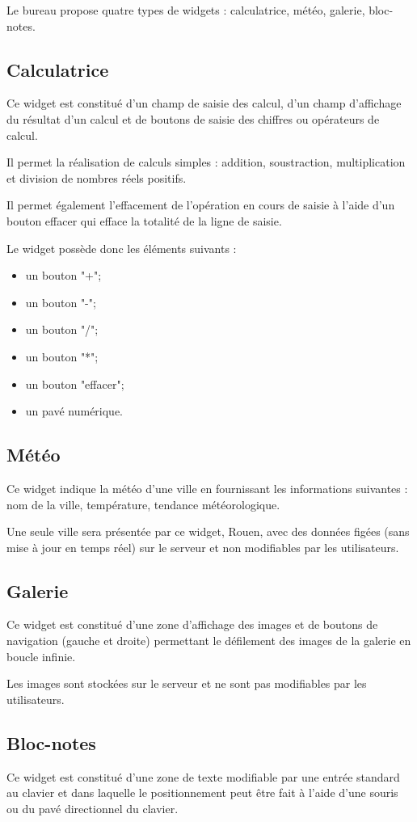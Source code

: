 Le bureau propose quatre types de widgets : calculatrice, météo, galerie, bloc-notes.

\subsection*{Calculatrice}
Ce widget est constitué d'un champ de saisie des calcul, d'un champ d'affichage du résultat d'un calcul et de boutons de saisie des chiffres ou opérateurs de calcul.

Il permet la réalisation de calculs simples : addition, soustraction, multiplication et division de nombres réels positifs.

Il permet également l'effacement de l'opération en cours de saisie à l'aide d'un bouton effacer qui efface la totalité de la ligne de saisie.

Le widget possède donc les éléments suivants :
\begin{itemize}
\item un bouton "+";
\item un bouton "-";
\item un bouton "/";
\item un bouton "*";
\item un bouton "effacer";
\item un pavé numérique.
\end{itemize}

\subsection*{Météo}
Ce widget indique la météo d'une ville en fournissant les informations suivantes : nom de la ville, température, tendance météorologique.

Une seule ville sera présentée par ce widget, Rouen, avec des données figées (sans mise à jour en temps réel) sur le serveur et non modifiables par les utilisateurs.

\subsection*{Galerie}
Ce widget est constitué d'une zone d'affichage des images et de boutons de navigation (gauche et droite) permettant le défilement des images de la galerie en boucle infinie.

Les images sont stockées sur le serveur et ne sont pas modifiables par les utilisateurs.

\subsection*{Bloc-notes}
Ce widget est constitué d'une zone de texte modifiable par une entrée standard au clavier et dans laquelle le positionnement peut être fait à l'aide d'une souris ou du pavé directionnel du clavier.